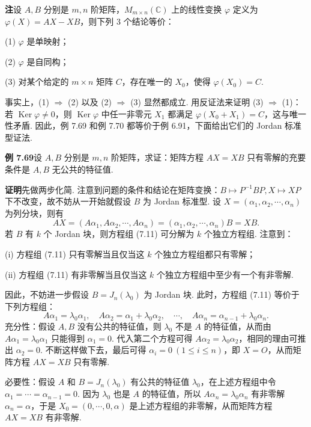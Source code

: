 \documentclass[UTF8,12pt,a4paper,fontset=fandol]{ctexart}
\begin{document}
\noindent\textbf{注}\quad 设 $A,B$ 分别是 $m,n$ 阶矩阵，$M_{m\times n}(\mathbb{C})$ 上的线性变换 $\varphi$ 定义为 $\varphi(X)=AX-XB$，则下列 3 个结论等价：

(1) $\varphi$ 是单映射；

(2) $\varphi$ 是自同构；

(3) 对某个给定的 $m\times n$ 矩阵 $C$，存在唯一的 $X_0$，使得 $\varphi(X_0)=C$.

事实上，(1) $\Rightarrow$ (2) 以及 (2) $\Rightarrow$ (3) 显然都成立. 用反证法来证明 (3) $\Rightarrow$ (1)：若 $\operatorname{Ker}\varphi\ne0$，则 $\operatorname{Ker}\varphi$ 中任一非零元 $X_1$ 都满足 $\varphi(X_0+X_1)=C$，这与唯一性矛盾. 因此，例 7.69 和例 7.70 都等价于例 6.91，下面给出它们的 Jordan 标准型证法.

\noindent\textbf{例 7.69}\quad 设 $A,B$ 分别是 $m,n$ 阶矩阵，求证：矩阵方程 $AX=XB$ 只有零解的充要条件是 $A,B$ 无公共的特征值.

\noindent\textbf{证明}\quad 先做两步化简. 注意到问题的条件和结论在矩阵变换：$B\mapsto P^{-1}BP,X\mapsto XP$ 下不改变，故不妨从一开始就假设 $B$ 为 Jordan 标准型. 设 $X=(\alpha_1,\alpha_2,\cdots,\alpha_n)$ 为列分块，则有
\begin{equation}
AX=(A\alpha_1,A\alpha_2,\cdots,A\alpha_n)=(\alpha_1,\alpha_2,\cdots,\alpha_n)B=XB.
\tag{7.11}
\end{equation}
若 $B$ 有 $k$ 个 Jordan 块，则方程组 (7.11) 可分解为 $k$ 个独立方程组. 注意到：

(i) 方程组 (7.11) 只有零解当且仅当这 $k$ 个独立方程组都只有零解；

(ii) 方程组 (7.11) 有非零解当且仅当这 $k$ 个独立方程组中至少有一个有非零解.

因此，不妨进一步假设 $B=J_n(\lambda_0)$ 为 Jordan 块. 此时，方程组 (7.11) 等价于下列方程组：
\[
A\alpha_1=\lambda_0\alpha_1,\quad A\alpha_2=\alpha_1+\lambda_0\alpha_2,\quad \cdots,\quad A\alpha_n=\alpha_{n-1}+\lambda_0\alpha_n.
\]
充分性：假设 $A,B$ 没有公共的特征值，则 $\lambda_0$ 不是 $A$ 的特征值，从而由 $A\alpha_1=\lambda_0\alpha_1$ 只能得到 $\alpha_1=0$. 代入第二个方程可得 $A\alpha_2=\lambda_0\alpha_2$，相同的理由可推出 $\alpha_2=0$. 不断这样做下去，最后可得 $\alpha_i=0\ (1\le i\le n)$，即 $X=O$，从而矩阵方程 $AX=XB$ 只有零解.

必要性：假设 $A$ 和 $B=J_n(\lambda_0)$ 有公共的特征值 $\lambda_0$，在上述方程组中令 $\alpha_1=\cdots=\alpha_{n-1}=0$. 因为 $\lambda_0$ 也是 $A$ 的特征值，所以 $A\alpha_n=\lambda_0\alpha_n$ 有非零解 $\alpha_n=\alpha$，于是 $X_0=(0,\cdots,0,\alpha)$ 是上述方程组的非零解，从而矩阵方程 $AX=XB$ 有非零解.
\end{document}
